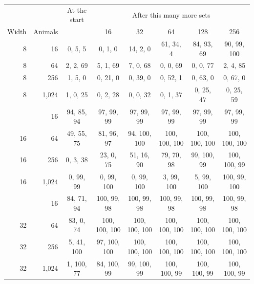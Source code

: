 \begin{tabular}{@{}rrcccccc@{}}
\toprule
 & & At the start & \multicolumn{5}{c}{After this many more sets} \\
Width & Animals & & 16 & 32 & 64 & 128 & 256 \\
\midrule
8 & 16 & 0, 5, 5 & 0, 1, 0 & 14, 2, 0 & 61, 34, 4 & 84, 93, 69 & 90, 99, 100 \\
8 & 64 & 2, 2, 69 & 5, 1, 69 & 7, 0, 68 & 0, 0, 69 & 0, 0, 77 & 2, 4, 85 \\
8 & 256 & 1, 5, 0 & 0, 21, 0 & 0, 39, 0 & 0, 52, 1 & 0, 63, 0 & 0, 67, 0 \\
8 & 1{,}024 & 1, 0, 25 & 0, 2, 28 & 0, 0, 32 & 0, 1, 37 & 0, 25, 47 & 0, 25, 59 \\
\addlinespace[3pt]
16 & 16 & 94, 85, 94 & 97, 99, 99 & 97, 99, 99 & 97, 99, 99 & 97, 99, 99 & 97, 99, 99 \\
16 & 64 & 49, 55, 75 & 81, 96, 97 & 94, 100, 100 & 100, 100, 100 & 100, 100, 100 & 100, 100, 100 \\
16 & 256 & 0, 3, 38 & 23, 0, 75 & 51, 16, 90 & 79, 70, 98 & 99, 100, 99 & 100, 100, 99 \\
16 & 1{,}024 & 0, 99, 99 & 0, 99, 100 & 0, 99, 100 & 3, 99, 100 & 5, 99, 100 & 100, 99, 100 \\
\addlinespace[3pt]
32 & 16 & 84, 71, 94 & 100, 99, 98 & 100, 99, 98 & 100, 99, 98 & 100, 99, 98 & 100, 99, 98 \\
32 & 64 & 83, 0, 74 & 100, 100, 100 & 100, 100, 100 & 100, 100, 100 & 100, 100, 100 & 100, 100, 100 \\
32 & 256 & 5, 41, 100 & 97, 100, 100 & 100, 100, 100 & 100, 100, 100 & 100, 100, 100 & 100, 100, 100 \\
32 & 1{,}024 & 1, 100, 77 & 84, 100, 99 & 99, 100, 99 & 100, 100, 99 & 100, 100, 99 & 100, 100, 99 \\
\bottomrule
\end{tabular}
